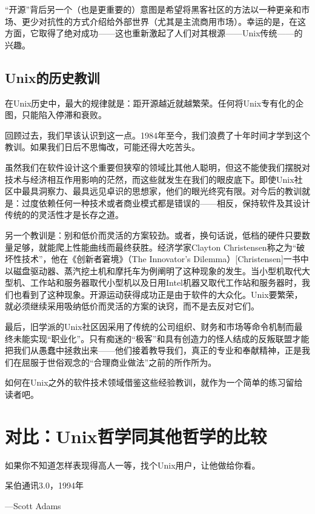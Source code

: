 \documentclass[11pt,oneside]{book}
\begin{document}
\begin{common-format}
“开源”背后另一个（也是更重要的）意图是希望将黑客社区的方法以一种更亲和市场、更少对抗性的方式介绍给外部世界（尤其是主流商用市场）。幸运的是，在这方面，它取得了绝对成功——这也重新激起了人们对其根源——Unix传统——的兴趣。

\section{Unix的历史教训}
在Unix历史中，最大的规律就是：距开源越近就越繁荣。任何将Unix专有化的企图，只能陷入停滞和衰败。

回顾过去，我们早该认识到这一点。1984年至今，我们浪费了十年时间才学到这个教训。如果我们日后不思悔改，可能还得大吃苦头。

虽然我们在软件设计这个重要但狭窄的领域比其他人聪明，但这不能使我们摆脱对技术与经济相互作用影响的茫然，而这些就发生在我们的眼皮底下。即使Unix社区中最具洞察力、最具远见卓识的思想家，他们的眼光终究有限。对今后的教训就是：过度依赖任何一种技术或者商业模式都是错误的——相反，保持软件及其设计传统的的灵活性才是长存之道。

另一个教训是：别和低价而灵活的方案较劲。或者，换句话说，低档的硬件只要数量足够，就能爬上性能曲线而最终获胜。经济学家Clayton Christensen称之为“破坏性技术”，他在《创新者窘境》（The Innovator's Dilemma）[Christensen]一书中以磁盘驱动器、蒸汽挖土机和摩托车为例阐明了这种现象的发生。当小型机取代大型机、工作站和服务器取代小型机以及日用Intel机器又取代工作站和服务器时，我们也看到了这种现象。开源运动获得成功正是由于软件的大众化。Unix要繁荣，就必须继续采用吸纳低价而灵活的方案的诀窍，而不是去反对它们。

最后，旧学派的Unix社区因采用了传统的公司组织、财务和市场等命令机制而最终未能实现“职业化”。只有痴迷的“极客”和具有创造力的怪人结成的反叛联盟才能把我们从愚蠢中拯救出来——他们接着教导我们，真正的专业和奉献精神，正是我们在屈服于世俗观念的“合理商业做法”之前的所作所为。

如何在Unix之外的软件技术领域借鉴这些经验教训，就作为一个简单的练习留给读者吧。




\chapter{对比：Unix哲学同其他哲学的比较}
\begin{flushright}
\begin{notecard}[red!30]
如果你不知道怎样表现得高人一等，找个Unix用户，让他做给你看。

呆伯通讯3.0，1994年

{\hfill —Scott Adams}
\end{notecard}
\end{flushright}


\end{common-format}
\end{document}
